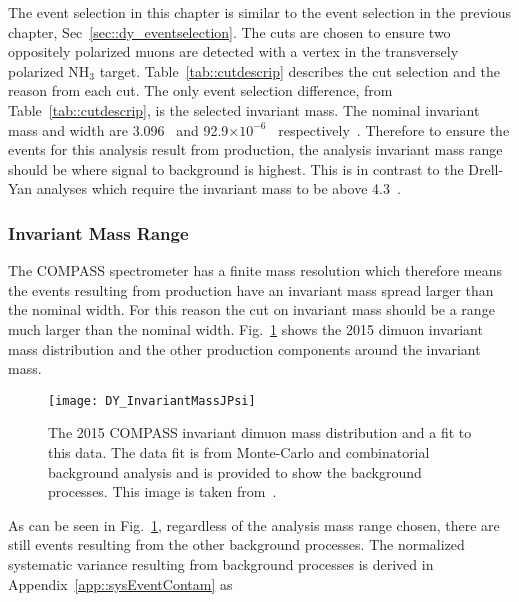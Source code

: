The event selection in this chapter is similar to the event selection in the
previous chapter, Sec~\ref{sec::dy_eventselection}.  The cuts are chosen to
ensure two oppositely polarized muons are detected with a vertex in the
transversely polarized NH$_3$ target.  Table~\ref{tab::cutdescrip} describes the
cut selection and the reason from each cut.  The only event selection
difference, from Table~\ref{tab::cutdescrip}, is the selected invariant mass.
The nominal {\jp} invariant mass and width are 3.096~{\gvcw} and
92.9$\times10^{-6}$~{\gvcw} respectively~\cite{Tanabashi:2018oca}.  Therefore to
ensure the events for this analysis result from {\jp} production, the analysis
invariant mass range should be where {\jp} signal to background is highest.
This is in contrast to the Drell-Yan analyses which require the invariant mass
to be above 4.3~{\gvcw}.

\subsubsection{{\jp} Invariant Mass Range}
The COMPASS spectrometer has a finite mass resolution which therefore means the
events resulting from {\jp} production have an invariant mass spread larger than
the nominal {\jp} width.  For this reason the cut on invariant mass should be a
range much larger than the nominal {\jp} width.
Fig.~\ref{fig::DY_InvariantMassJPsi} shows the 2015 dimuon invariant mass
distribution and the other production components around the {\jp} invariant
mass.

\begin{figure}[h!t]
  \centering \texttt{[image: DY\_InvariantMassJPsi]}
  \caption{The 2015 COMPASS invariant dimuon mass distribution and a fit to this
    data.  The data fit is from Monte-Carlo and combinatorial background
    analysis and is provided to show the background processes.  This image is
    taken from~\cite{compassDYpaper}.}
  \label{fig::DY_InvariantMassJPsi}
\end{figure}

As can be seen in Fig.~\ref{fig::DY_InvariantMassJPsi}, regardless of the
analysis mass range chosen, there are still events resulting from the other
background processes.  The normalized systematic variance resulting from
background processes is derived in Appendix~\ref{app::sysEventContam} as


